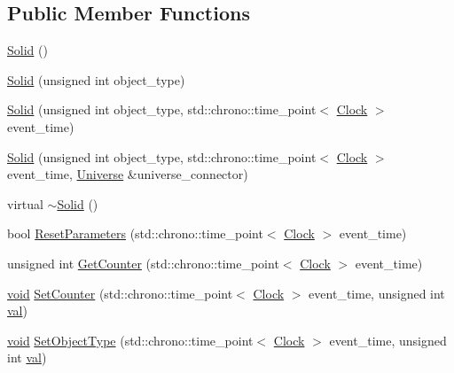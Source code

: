 \subsection*{Public Member Functions}
\begin{DoxyCompactItemize}
\item 
\mbox{\hyperlink{class_solid_a2cf157c87df66dc3eb8722f9b3ee8f66}{Solid}} ()
\item 
\mbox{\hyperlink{class_solid_a00a71dfc929ca50ee9850bdfca5b3fd6}{Solid}} (unsigned int object\+\_\+type)
\item 
\mbox{\hyperlink{class_solid_a9f5476b751c749af38b349b9fc7e2ba5}{Solid}} (unsigned int object\+\_\+type, std\+::chrono\+::time\+\_\+point$<$ \mbox{\hyperlink{universe_8h_a0ef8d951d1ca5ab3cfaf7ab4c7a6fd80}{Clock}} $>$ event\+\_\+time)
\item 
\mbox{\hyperlink{class_solid_a80746ad255dded6090e648fc3f0dbd93}{Solid}} (unsigned int object\+\_\+type, std\+::chrono\+::time\+\_\+point$<$ \mbox{\hyperlink{universe_8h_a0ef8d951d1ca5ab3cfaf7ab4c7a6fd80}{Clock}} $>$ event\+\_\+time, \mbox{\hyperlink{class_universe}{Universe}} \&universe\+\_\+connector)
\item 
virtual \mbox{\hyperlink{class_solid_a07095e0808c0ef6b206bc70992ef557d}{$\sim$\+Solid}} ()
\item 
bool \mbox{\hyperlink{class_solid_ac43dc78fa7f6a3348fc99751ff6bbc52}{Reset\+Parameters}} (std\+::chrono\+::time\+\_\+point$<$ \mbox{\hyperlink{universe_8h_a0ef8d951d1ca5ab3cfaf7ab4c7a6fd80}{Clock}} $>$ event\+\_\+time)
\item 
unsigned int \mbox{\hyperlink{class_solid_a7ca41431033d05957f8be3f49c3aca23}{Get\+Counter}} (std\+::chrono\+::time\+\_\+point$<$ \mbox{\hyperlink{universe_8h_a0ef8d951d1ca5ab3cfaf7ab4c7a6fd80}{Clock}} $>$ event\+\_\+time)
\item 
\mbox{\hyperlink{glad_8h_a950fc91edb4504f62f1c577bf4727c29}{void}} \mbox{\hyperlink{class_solid_aea949040518e505ed39b1456a360c5e0}{Set\+Counter}} (std\+::chrono\+::time\+\_\+point$<$ \mbox{\hyperlink{universe_8h_a0ef8d951d1ca5ab3cfaf7ab4c7a6fd80}{Clock}} $>$ event\+\_\+time, unsigned int \mbox{\hyperlink{glad_8h_a26942fd2ed566ef553eae82d2c109c8f}{val}})
\item 
\mbox{\hyperlink{glad_8h_a950fc91edb4504f62f1c577bf4727c29}{void}} \mbox{\hyperlink{class_solid_af6fe46af0be9a9533e114b1c0f186bfc}{Set\+Object\+Type}} (std\+::chrono\+::time\+\_\+point$<$ \mbox{\hyperlink{universe_8h_a0ef8d951d1ca5ab3cfaf7ab4c7a6fd80}{Clock}} $>$ event\+\_\+time, unsigned int \mbox{\hyperlink{glad_8h_a26942fd2ed566ef553eae82d2c109c8f}{val}})

\end{DoxyCompactItemize}
